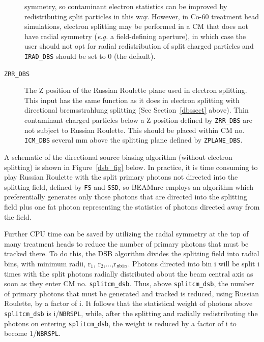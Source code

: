\documentclass[12pt,twoside]{article}
\begin{document}
\begin{description}
symmetry, so contaminant electron statistics can be improved by redistributing split particles in this way.  However, in Co-60 treatment head simulations,
electron splitting may be performed in a CM that does not have radial symmetry ({\em e.g.} a field-defining aperture),
in which case the user should not opt for radial redistribution of split charged particles and {\tt IRAD\_DBS}
should be set to 0 (the default).
\item [{\tt ZRR\_DBS}] The Z position of the Russian Roulette plane
used in electron splitting.  This input has the same function as it does in electron splitting with
directional bremsstrahlung splitting
(See Section~\ref{dbssect} above).  Thin contaminant charged particles below a Z position defined by {\tt ZRR\_DBS}
are not subject to Russian Roulette.  This should be placed within CM no. {\tt ICM\_DBS} several mm above the splitting plane defined by {\tt ZPLANE\_DBS}.
\end{description}

A schematic of the directional source biasing algorithm (without electron splitting) is shown in Figure~\ref{dsb_fig}
below.  In practice, it is time consuming to play Russian Roulette with the split primary photons not directed into
the splitting field, defined by {\tt FS} and {\tt SSD}, so BEAMnrc employs an algorithm which preferentially
generates only those photons that are directed into the splitting field plus one fat photon representing the
statistics of photons directed away from the field.

Further CPU time can be saved by utilizing the radial symmetry at the top of many treatment heads to reduce the
number of primary photons that must be tracked there.  To do this, the DSB algorithm divides the splitting field
into radial bins, with minimum radii, r$_1$, r$_2$,...,r$_{\tt nbin}$.
Photons directed into bin i will be split
i times with the split photons radially distributed about the beam central axis as soon as they enter
CM no. {\tt splitcm\_dsb}.  Thus, above {\tt splitcm\_dsb}, the number of primary photons that must be
generated and tracked is
reduced, using Russian Roulette, by a factor of i.  It follows that the statistical weight of photons above {\tt splitcm\_dsb} is i/{\tt NBRSPL}, while, after the splitting and radially redistributing the photons on entering {\tt splitcm\_dsb}, the weight is
reduced by a factor of i to become 1/{\tt NBRSPL}.
\end{document}

